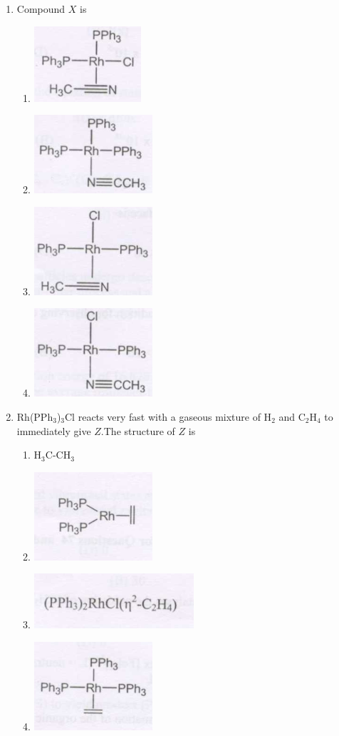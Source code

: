 \documentclass[12pt]{article}
\begin{document}
\begin{enumerate}
\item Compound $X$ is

\begin{enumerate}
\item \includegraphics[width=0.2\columnwidth]{figs/q76 a.png}
\item \includegraphics[width=0.2\columnwidth]{figs/q76 b.png}
\item \includegraphics[width=0.2\columnwidth]{figs/q76 c.png}
\item \includegraphics[width=0.2\columnwidth]{figs/q76 d.png}
\end{enumerate}    \hfill{}


\item Rh(PPh$_3$)$_3$Cl reacts very fast with a gaseous mixture of H$_2$ and C$_2$H$_4$ to immediately give $Z$.The structure of $Z$ is

\begin{enumerate}
\item H$_3$C-CH$_3$
\item \includegraphics[width=0.3\columnwidth]{figs/q77 b.png}
\item \includegraphics[width=0.3\columnwidth]{figs/q77 c.png}
\item \includegraphics[width=0.3\columnwidth]{figs/q77 d.png}
\end{enumerate}    \hfill{}



\end{enumerate}
\end{document}
